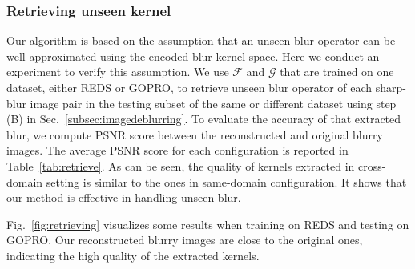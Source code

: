 \documentclass[final]{cvpr}
\newcommand{\Sref}[1]{Sec.~\ref{#1}}
\newcommand{\Fref}[1]{Fig.~\ref{#1}}
\newcommand{\Tref}[1]{Table~\ref{#1}}
\newcommand{\Aref}[1]{Algorithm~\ref{#1}}
\begin{document}
\subsubsection{Retrieving unseen kernel}\label{sec:exp_retrieve}
Our algorithm is based on the assumption that an unseen blur operator can be well approximated using the encoded blur kernel space. Here we conduct an experiment to verify this assumption. We use $\mathcal{F}$ and $\mathcal{G}$ that are trained on one dataset, either REDS or GOPRO, to retrieve unseen blur operator of each sharp-blur image pair in the testing subset of the same or different dataset using step (B) in \Sref{subsec:imagedeblurring}. To evaluate the accuracy of that extracted blur, we compute PSNR score between the reconstructed and original blurry images. The average PSNR score for each configuration is reported in  \Tref{tab:retrieve}. As can be seen, the quality of kernels extracted in cross-domain setting is similar to the ones in same-domain configuration. It shows that our method is effective in handling unseen blur.


\Fref{fig:retrieving} visualizes some results when training on REDS and testing on GOPRO. Our reconstructed blurry images are close to the original ones, indicating the high quality of the extracted kernels.
\end{document}
